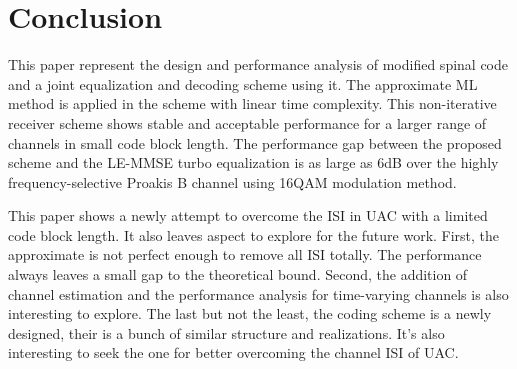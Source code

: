 \documentclass[conference]{IEEEtran}
\begin{document}

\section{Conclusion}
This paper represent the design and performance analysis of modified spinal code and a joint equalization and decoding scheme using it. The approximate ML method is applied in the scheme with linear time complexity.  This non-iterative receiver scheme shows stable and acceptable performance for a larger range of channels in small code block length. The performance gap between the proposed scheme and the LE-MMSE turbo equalization is as large as 6dB over the highly frequency-selective Proakis B channel using 16QAM modulation method. 

This paper shows a newly attempt to overcome the ISI in UAC with a limited code block length. It also leaves aspect to explore for the future work. First, the approximate is not perfect enough to remove all ISI totally. The performance always leaves a small gap to the theoretical bound. Second, the addition of channel estimation and the performance analysis for time-varying channels is also interesting to explore. The last but not the least, the coding scheme is a newly designed, their is a bunch of similar structure and realizations. It's also interesting to seek the one for better overcoming the channel ISI of UAC.








\end{document}
